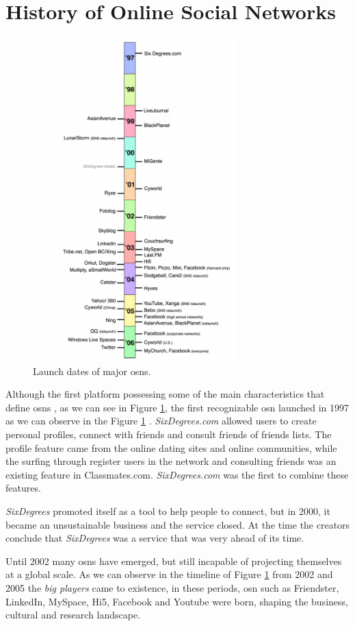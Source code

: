 \section{History of Online Social Networks}
\begin{figure}[h!]
\begin{center}
  \includegraphics[width=0.7\textwidth]{img/timeline.png}
\end{center}
\caption{\label{img:timeline} Launch dates of major \glspl{osn}.}
\end{figure}

Although the first platform possessing some of the main characteristics that define \glspl{osn} \citep{ellison2007social}, as we can see in Figure \ref{img:timeline}, the first recognizable \gls{osn} launched in 1997 as we can observe in the Figure \ref{img:timeline} \citep{ellison2007social}. \textit{SixDegrees.com} allowed users to create personal
profiles, connect with friends and consult friends of friends lists. The profile feature came from the
online dating sites and online communities, while the surfing through register users in the network
and consulting friends was an existing feature in Classmates.com. \textit{SixDegrees.com} was the first to combine
these features.

\textit{SixDegrees} promoted itself as a tool to help people to connect, but in 2000, it became an
unsustainable business and the service closed. At the time the creators conclude that
\textit{SixDegrees} was a service that was very ahead of its time.

Until 2002 many \glspl{osn} have emerged, but still incapable of projecting themselves at a global scale.
As we can observe in the timeline of Figure \ref{img:timeline} \citep{ellison2007social} from 2002 and 2005 the \textit{big players} came to existence, in these periods, \gls{osn}
such as Friendster, LinkedIn, MySpace, Hi5, Facebook and Youtube were born, shaping the business, cultural
and research landscape.
